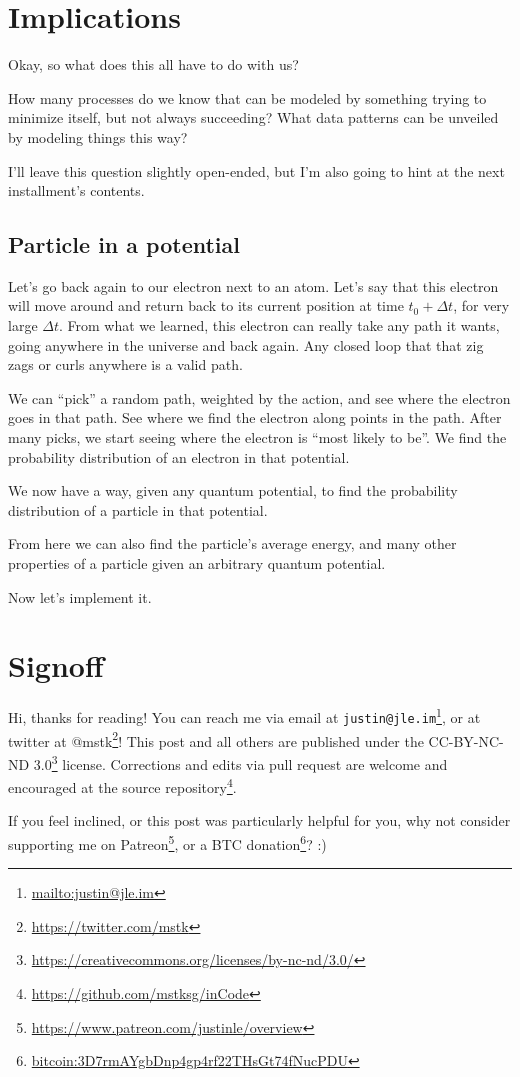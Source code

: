 \documentclass[]{article}
\renewcommand{\href}[2]{#2\footnote{\url{#1}}}
\begin{document}
\section{Implications}\label{implications}

Okay, so what does this all have to do with us?

How many processes do we know that can be modeled by something trying to
minimize itself, but not always succeeding? What data patterns can be unveiled
by modeling things this way?

I'll leave this question slightly open-ended, but I'm also going to hint at the
next installment's contents.

\subsection{Particle in a potential}\label{particle-in-a-potential}

Let's go back again to our electron next to an atom. Let's say that this
electron will move around and return back to its current position at time
\(t_0 + \Delta t\), for very large \(\Delta t\). From what we learned, this
electron can really take any path it wants, going anywhere in the universe and
back again. Any closed loop that that zig zags or curls anywhere is a valid
path.

We can ``pick'' a random path, weighted by the action, and see where the
electron goes in that path. See where we find the electron along points in the
path. After many picks, we start seeing where the electron is ``most likely to
be''. We find the probability distribution of an electron in that potential.

We now have a way, given any quantum potential, to find the probability
distribution of a particle in that potential.

From here we can also find the particle's average energy, and many other
properties of a particle given an arbitrary quantum potential.

Now let's implement it.

\section{Signoff}\label{signoff}

Hi, thanks for reading! You can reach me via email at
\href{mailto:justin@jle.im}{\nolinkurl{justin@jle.im}}, or at twitter at
\href{https://twitter.com/mstk}{@mstk}! This post and all others are published
under the \href{https://creativecommons.org/licenses/by-nc-nd/3.0/}{CC-BY-NC-ND
3.0} license. Corrections and edits via pull request are welcome and encouraged
at \href{https://github.com/mstksg/inCode}{the source repository}.

If you feel inclined, or this post was particularly helpful for you, why not
consider \href{https://www.patreon.com/justinle/overview}{supporting me on
Patreon}, or a \href{bitcoin:3D7rmAYgbDnp4gp4rf22THsGt74fNucPDU}{BTC donation}?
:)
\end{document}
